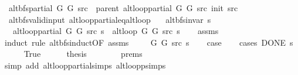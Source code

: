 \begin{isabellebody}
\ \ {\isachardoublequoteopen}alt{\isacharunderscore}{\kern0pt}bfs{\isacharunderscore}{\kern0pt}partial\ G{}\ G{}\ src\ {\isasymequiv}\ parent\ {\isacharparenleft}{\kern0pt}alt{\isacharunderscore}{\kern0pt}loop{\isacharunderscore}{\kern0pt}partial\ G{}\ G{}\ src\ {\isacharparenleft}{\kern0pt}init\ src{\isacharparenright}{\kern0pt}{\isacharparenright}{\kern0pt}{\isachardoublequoteclose}\isanewline
\isanewline
{}\isamarkupfalse%
\ {\isacharparenleft}{\kern0pt}\ alt{\isacharunderscore}{\kern0pt}bfs{\isacharunderscore}{\kern0pt}valid{\isacharunderscore}{\kern0pt}input{\isacharparenright}{\kern0pt}\ alt{\isacharunderscore}{\kern0pt}loop{\isacharunderscore}{\kern0pt}partial{\isacharunderscore}{\kern0pt}eq{\isacharunderscore}{\kern0pt}alt{\isacharunderscore}{\kern0pt}loop{\isacharcolon}{\kern0pt}\isanewline
\ \ \ {\isachardoublequoteopen}alt{\isacharunderscore}{\kern0pt}bfs{\isacharunderscore}{\kern0pt}invar{\isacharprime}{\kern0pt}{\isacharprime}{\kern0pt}\ s{\isachardoublequoteclose}\isanewline
\ \ \ {\isachardoublequoteopen}alt{\isacharunderscore}{\kern0pt}loop{\isacharunderscore}{\kern0pt}partial\ G{}\ G{}\ src\ s\ {\isacharequal}{\kern0pt}\ alt{\isacharunderscore}{\kern0pt}loop\ G{}\ G{}\ src\ s{\isachardoublequoteclose}\isanewline
%
\isadelimproof
\ \ %
\endisadelimproof
%
\isatagproof
{}\isamarkupfalse%
\ assms\isanewline
{}\isamarkupfalse%
\ {\isacharparenleft}{\kern0pt}induct\ rule{\isacharcolon}{\kern0pt}\ alt{\isacharunderscore}{\kern0pt}bfs{\isacharunderscore}{\kern0pt}induct{\isacharbrackleft}{\kern0pt}OF\ assms{\isacharbrackright}{\kern0pt}{\isacharparenright}{\kern0pt}\isanewline
\ \ \isamarkupfalse%
\ {\isacharparenleft}{\kern0pt}{}\ G{}\ G{}\ src\ s{\isacharparenright}{\kern0pt}\isanewline
\ \ \isamarkupfalse%
\ {\isacharquery}{\kern0pt}case\isanewline
\ \ \isamarkupfalse%
\ {\isacharparenleft}{\kern0pt}cases\ {\isachardoublequoteopen}DONE\ s{\isachardoublequoteclose}{\isacharparenright}{\kern0pt}\isanewline
\ \ \ \ \isamarkupfalse%
\ True\isanewline
\ \ \ \ \isamarkupfalse%
\ {\isacharquery}{\kern0pt}thesis\isanewline
\ \ \ \ \ \ \isamarkupfalse%
\ {\isachardoublequoteopen}{}{\isachardot}{\kern0pt}prems{\isachardoublequoteclose}\isanewline
\ \ \ \ \ \ \isamarkupfalse%
\ {\isacharparenleft}{\kern0pt}simp\ add{\isacharcolon}{\kern0pt}\ alt{\isacharunderscore}{\kern0pt}loop{\isacharunderscore}{\kern0pt}partial{\isachardot}{\kern0pt}simps\ alt{\isacharunderscore}{\kern0pt}loop{\isacharunderscore}{\kern0pt}psimps{\isacharparenright}{\kern0pt}\isanewline

\end{isabellebody}
